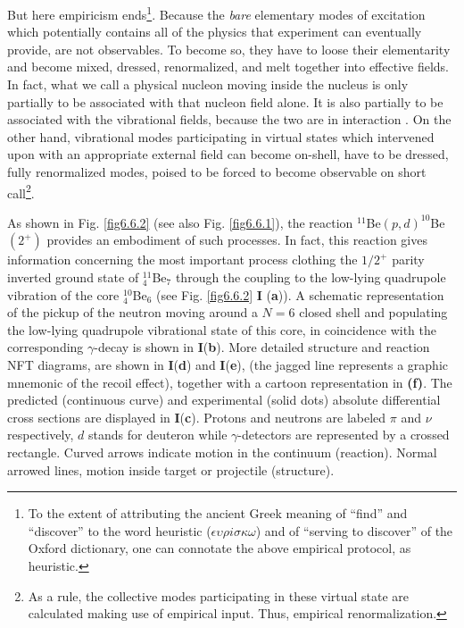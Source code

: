 But here empiricism ends\footnote{To the extent of attributing the ancient Greek meaning of ``find'' and ``discover'' to the word heuristic ($\epsilon\upsilon\rho i \sigma\kappa\omega$) and of ``serving to discover'' of the Oxford dictionary, one can connotate the above empirical protocol, as heuristic.}. Because the \textit{bare} elementary modes of excitation which potentially contains all of the physics that experiment can eventually provide, are not observables. To become so, they have to loose their elementarity and become mixed, dressed, renormalized, and melt together into effective fields. In fact, what we call a physical nucleon moving inside the nucleus is only partially to be associated with that nucleon field alone. It is also partially to be associated with the vibrational fields, because the two are in interaction . On the other hand, vibrational modes participating in virtual states which intervened upon with an appropriate external field can become on-shell, have to be dressed, fully renormalized modes, poised to be forced to become observable on short call\footnote{As a rule, the collective modes participating in these virtual state are calculated making use of empirical input. Thus, empirical renormalization.}.


As shown in Fig. \ref{fig6.6.2} (see also Fig. \ref{fig6.6.1}), the reaction $^{11}$Be$(p,d)^{10}$Be$(2^+)$ provides an embodiment of such processes.  	 In fact, this reaction gives information concerning the most important process   clothing   the $1/2^+$ parity inverted ground state of $^{11}_4$Be$_{7}$
through the coupling to the low-lying quadrupole vibration of the core $^{10}_4$Be$_6$ (see Fig. \ref{fig6.6.2} \textbf{I} (\textbf{a})). A schematic representation 
of the pickup of the neutron moving around a $N=6$ closed shell and populating the low-lying
quadrupole vibrational state of this core, in coincidence with the corresponding $\gamma$-decay is shown in \textbf{I}(\textbf{b}).  More  detailed structure and reaction NFT diagrams,  
are	shown in  \textbf{I}(\textbf{d}) and \textbf{I}(\textbf{e}), (the jagged line represents 
a graphic mnemonic of the recoil effect),  together with a cartoon representation in {\bf (f)}. The predicted (continuous curve) and experimental
(solid dots) absolute differential cross sections   are displayed in \textbf{I}(\textbf{c}).
Protons 
and neutrons are labeled $\pi$ and $\nu$ respectively,  $d$ stands for deuteron while $\gamma$-detectors are represented by a crossed rectangle.
Curved arrows indicate  motion in the continuum (reaction). Normal arrowed 
lines, motion inside target or projectile (structure).  


